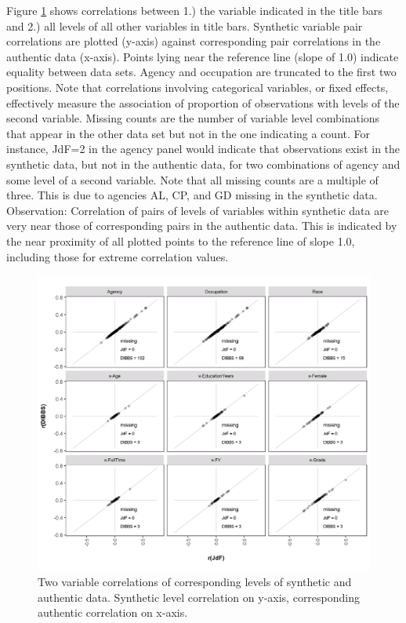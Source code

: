 \documentclass[10pt, letterpaper]{article}
\begin{document}
\begin{spacing}{1.0}
Figure \ref{figure:JdFDIBBSCorrelation} shows correlations between 1.) the variable indicated in the title bars and 2.) all levels of all other variables in title bars.  Synthetic variable pair correlations are plotted (y-axis) against corresponding pair correlations in the authentic data (x-axis).  Points lying near the reference line (slope of 1.0) indicate equality between data sets.  Agency and occupation are truncated to the first two positions.  Note that correlations involving categorical variables, or fixed effects, effectively measure the association of proportion of observations with levels of the second variable.  Missing counts are the number of variable level combinations that appear in the other data set but not in the one indicating a count.  For instance, JdF=2 in the agency panel would indicate that observations exist in the synthetic data, but not in the authentic data, for two combinations of agency and some level of a second variable.  Note that all missing counts are a multiple of three.  This is due to agencies AL, CP, and GD missing in the synthetic data.\\

Observation:  Correlation of pairs of levels of variables within synthetic data are very near those of  corresponding pairs in the authentic data. This is indicated by the near proximity of all plotted points to the reference line of slope 1.0, including those for extreme correlation values.  

\begin{figure}[h]
    \includegraphics[width=5in]{JdFDIBBSCorrelation.png}
    \centering
    \caption{Two variable correlations of corresponding levels of synthetic and authentic data.  Synthetic level correlation on y-axis, corresponding authentic correlation on x-axis.}
    \label{figure:JdFDIBBSCorrelation}
\end{figure}  


\end{spacing}
\end{document}
